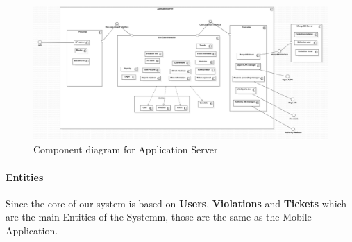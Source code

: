 \begin{figure}
\centering
\includegraphics[width=\textwidth]{Images/ComponentDiagram2.png}
\caption{\label{fig:compdiag2} Component diagram for Application Server}
\end{figure}


\paragraph{Entities}
 Since the core of our system is based on \textbf{Users}, \textbf{Violations} and \textbf{Tickets} which are the main Entities of the Systemm, those are the same as the Mobile Application.

